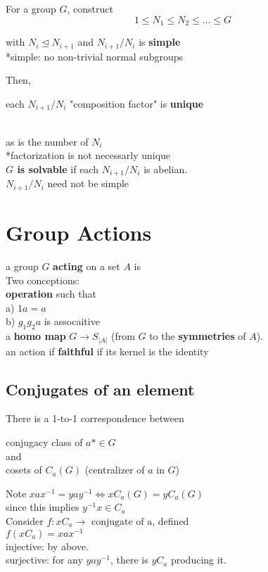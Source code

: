 \documentclass[12pt]{article}
\begin{document}
For a group $G$, construct 
$$1 \leq N_1 \leq N_2 \leq ... \leq G$$

with $N_i \trianglelefteq N_{i + 1}$ and $N_{i+1} / N_{i}$ is \textbf{simple} \\

*simple: no non-trivial normal subgroups 

Then, \\
 \centerline{each $N_{i+1} / N_i$ "composition factor" is \textbf{unique}}
\ \\
 \indent as is the number of $N_i$\\

*factorization is not necessarly unique\\

\textbf{$G$ is solvable} if each $N_{i+1} / N_i$ is abelian.\\
\indent*$N_{i+1} / N_i$ need not be simple


\section*{Group Actions}


a group $G$ \textbf{acting} on a set $A$ is \\

\noindent Two conceptions:\\

\noindent \textbf{operation} such that\\
\indent a) $1a =a$ \\
\indent b) $g_1g_2a$ is assocaitive\\


\noindent a \textbf{homo map} $G \rightarrow S_{|A|}$ (from $G$ to the \textbf{symmetries} of $A$).\\

\noindent an action if \textbf{faithful} if its kernel is the identity\\

\subsection*{Conjugates of an element}

There is a 1-to-1 correspondence between\\
\begin{center}
conjugacy class of $a * \in G$ \\
and \\
cosets of $C_a(G)$ (centralizer of $a$ in $G$) \\
\end{center}
\textcolor[gray]{0.5}{Note $xax^{-1} = yay^{-1} \iff xC_a(G) = yC_a(G)$\\
since this implies $y^{-1}x \in C_a$\\
Consider $f: x C_a \rightarrow \text{ conjugate of a}$, defined\\
$f(x C_a) = xax^{-1}$\\
injective: by above. \\
surjective: for any $yay^{-1}$, there is $yC_a$ producing it.}\\
\end{document}
